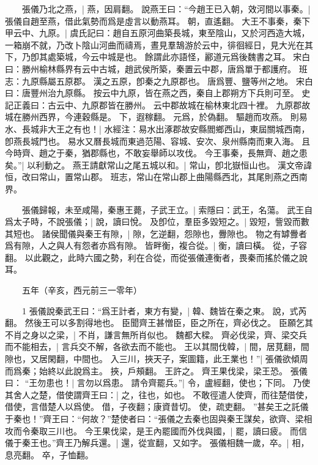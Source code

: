 　　張儀乃北之燕，|{
	燕，因肩翻。
}
說燕王曰：“今趙王已入朝，效河間以事秦。|{
	張儀自趙至燕，借此氣勢而爲是虛言以動燕耳。
	朝，直遙翻。
}
大王不事秦，秦下甲云中、九原。|{
	虞氏記曰：趙自五原河曲築長城，東至陰山，又於河西造大城，一箱崩不就，乃改卜陰山河曲而禱焉，晝見羣鵠游於云中，徘徊經日，見大光在其下，乃卽其處築城，今云中城是也。
	餘謂此亦語怪，酈道元爲後魏書之耳。
	宋白曰：勝州榆林縣界有云中古城，趙武侯所築，秦置云中郡，唐爲單于都護府。
	班志：九原縣屬五原郡。
	漢之五原，卽秦之九原郡也。
	唐爲豐、鹽等州之地。
	宋白曰：唐豐州治九原縣。
	按云中九原，皆在燕之西，秦自上郡朔方下兵則可至。
	史記正義曰：古云中、九原郡皆在勝州。
	云中郡故城在榆林東北四十裡。
	九原郡故城在勝州西界，今連穀縣是。
	下，遐稼翻。
	元爲，於偽翻。
}
驅趙而攻燕。
	則易水、長城非大王之有也！|{
	水經注：易水出涿郡故安縣閻鄉西山，東屆關城西南，卽燕長城門也。
	易水又曆長城而東過范陽、容城、安次、泉州縣南而東入海。
}
且今時齊、趙之于秦，猶郡縣也，不敢妄舉師以攻伐。
	今王事秦，長無齊、趙之患矣。”|{
	以利動之。
}
燕王請獻常山之尾五城以和。|{
	常山，卽北嶽恒山也。
	漢文帝諱恒，改曰常山，置常山郡。
	班志，常山在常山郡上曲陽縣西北，其尾則燕之西南界。
}

　　張儀歸報，未至咸陽，秦惠王薨，子武王立。|{
	索隱曰：武王，名蕩。
}
武王自爲太子時，不說張儀；|{
	說，讀曰悅。
}
及卽位，羣臣多毀短之。|{
	毀短，訾毀而數其短也。
}
諸侯聞儀與秦王有隙，|{
	隙，乞逆翻，怨隙也，釁隙也。
	物之有罅釁者爲有隙，人之與人有怨者亦爲有隙。
}
皆畔衡，複合從。|{
	衡，讀曰橫。
	從，子容翻。
	以此觀之，此時六國之勢，利在合從，而從張儀連衡者，畏秦而搖於儀之說耳。
}

　　五年（辛亥，西元前三一零年）

　　1 張儀說秦武王曰：“爲王計者，東方有變，|{
	韓、魏皆在秦之東。
	說，式芮翻。
}
然後王可以多割得地也。
	臣聞齊王甚憎臣，臣之所在，齊必伐之。
	臣願乞其不肖之身以之梁，|{
	不肖，謙言無所肖似也。
	魏都大樑。
}
齊必伐梁，齊、梁交兵而不能相去，|{
	言兵交不解，各欲去而不能也。
}
王以其間伐韓，|{
	間，居莧翻，間隙也，又居閑翻，中間也。
}
入三川，挾天子，案圖籍，此王業也！”|{
	張儀欲傾周而爲秦；始終以此說爲主。
	挾，戶頰翻。
}
王許之。
	齊王果伐梁，梁王恐。
	張儀曰： “王勿患也！|{
	言勿以爲患。
}
請令齊罷兵。”|{
	令，盧經翻，使也；下同。
}
乃使其舍人之楚，借使謂齊王曰：|{
	之，往也，如也。
	不敢徑遣人使齊，而往楚借使，借使，言借楚人以爲使。
	借，子夜翻；康資昔切。
	使，疏吏翻。
}
”甚矣王之託儀于秦也！”齊王曰：“何故？”楚使者曰：“張儀之去秦也固與秦王謀矣，欲齊、梁相攻而令秦取三川也。
	今王果伐梁，是王內罷國而外伐與國，|{
	罷，讀曰疲。
}
而信儀于秦王也。”齊王乃解兵還。|{
	還，從宣翻，又如字。
}
張儀相魏一歲，卒。|{
	相，息亮翻。
	卒，子恤翻。
}


